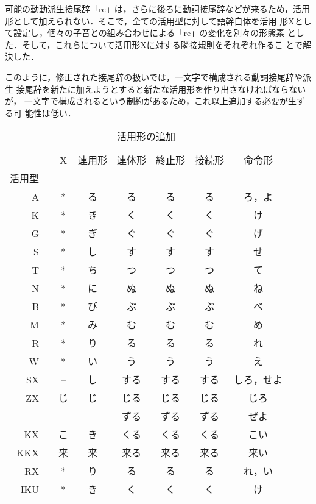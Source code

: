 可能の動動派生接尾辞「re」は，さらに後ろに動詞接尾辞などが来るため，活用
形として加えられない．そこで，全ての活用型に対して語幹自体を活用
形Xとして設定し，個々の子音との組み合わせによる「re」の変化を別々の形態素
とした．そして，これらについて活用形Xに対する隣接規則をそれぞれ作るこ
とで解決した．

このように，修正された接尾辞の扱いでは，一文字で構成される動詞接尾辞や派生
接尾辞を新たに加えようとすると新たな活用形を作り出さなければならないが，
一文字で構成されるという制約があるため，これ以上追加する必要が生ずる可
能性は低い．


\begin{table*}
\begin{center}
\begin{tabular}{|rl|cccccc|}
\hline
 & \hspace{-5mm}{\tiny 活用形} & X & 連用形  & 連体形  & 終止形  & 接続形  & 命令形 \\
{\tiny 活用型} &&&&&&&\\
\hline
A && * & る & る & る & る & ろ，よ \\
K && * & き & く & く & く & け \\
G && * & ぎ & ぐ & ぐ & ぐ & げ \\
S && * & し & す & す & す & せ \\
T && * & ち & つ & つ & つ & て \\
N && * & に & ぬ & ぬ & ぬ & ね \\
B && * & び & ぶ & ぶ & ぶ & べ \\
M && * & み & む & む & む & め \\
R && * & り & る & る & る & れ \\
W && * & い & う & う & う & え \\
SX && --& し & する & する & する & しろ，せよ \\
ZX && じ & じ & じる & じる & じる & じろ \\
   &&    &    & ずる & ずる & ずる & ぜよ \\
KX && こ & き & くる & くる & くる & こい \\
KKX && 来 & 来 & 来る & 来る & 来る & 来い \\
RX && * & り & る & る & る & れ，い \\
IKU && * & き & く & く & く & け \\
\hline
\end{tabular}
\end{center}
\caption{活用形の追加}
\label{katuyou2}
\end{table*}

